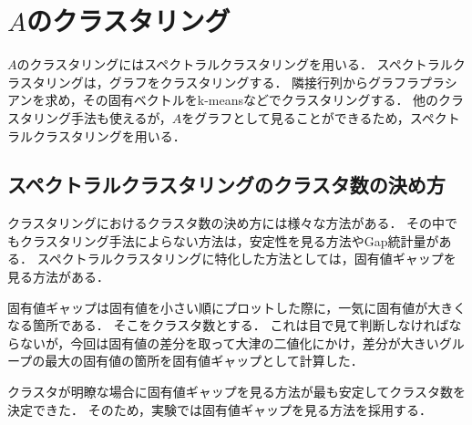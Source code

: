 \section{$A$のクラスタリング}
$A$のクラスタリングにはスペクトラルクラスタリングを用いる．
スペクトラルクラスタリングは，グラフをクラスタリングする．
隣接行列からグラフラプラシアンを求め，その固有ベクトルをk-meansなどでクラスタリングする．
他のクラスタリング手法も使えるが，$A$をグラフとして見ることができるため，スペクトラルクラスタリングを用いる．
\subsection{スペクトラルクラスタリングのクラスタ数の決め方}
クラスタリングにおけるクラスタ数の決め方には様々な方法がある．
その中でもクラスタリング手法によらない方法は，安定性を見る方法\cite{Ben-Hur}やGap統計量\cite{Tibshirani}がある．
スペクトラルクラスタリングに特化した方法としては，固有値ギャップを見る方法\cite{VonLuxburg}がある．

固有値ギャップは固有値を小さい順にプロットした際に，一気に固有値が大きくなる箇所である．
そこをクラスタ数とする．
これは目で見て判断しなければならないが，今回は固有値の差分を取って大津の二値化にかけ，差分が大きいグループの最大の固有値の箇所を固有値ギャップとして計算した．

クラスタが明瞭な場合に固有値ギャップを見る方法が最も安定してクラスタ数を決定できた．
そのため，実験では固有値ギャップを見る方法を採用する．
